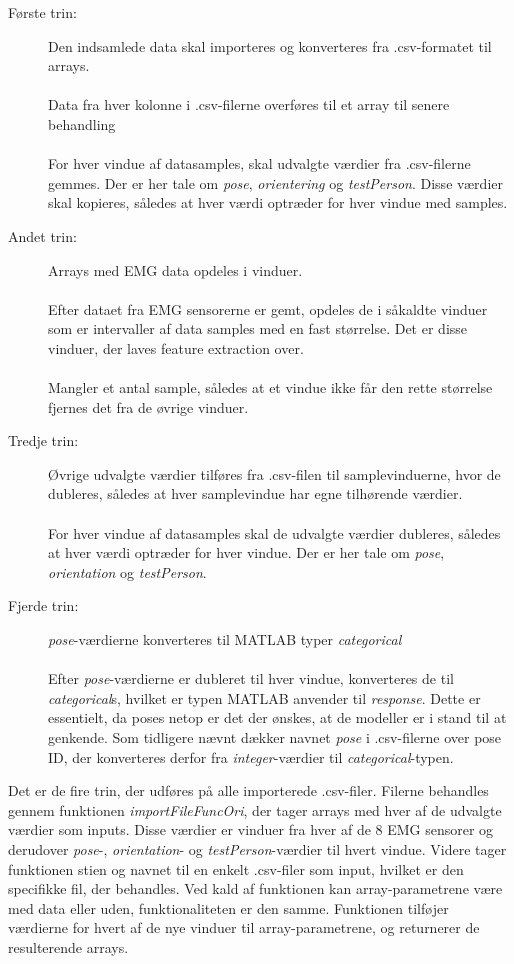 \begin{description}
	\item[Første trin:] Den indsamlede data skal importeres og konverteres fra .csv-formatet til arrays.\\\\
		Data fra hver kolonne i .csv-filerne overføres til et array til senere behandling
	\\\\
	For hver vindue af datasamples, skal udvalgte værdier fra .csv-filerne gemmes. Der er her tale om \textit{pose}, \textit{orientering} og \textit{testPerson}. Disse værdier skal kopieres, således at hver værdi optræder for hver vindue med samples.

  \item[Andet trin:] Arrays med EMG data opdeles i vinduer. 
  \\\\
  Efter dataet fra EMG sensorerne er gemt, opdeles de i såkaldte vinduer som er intervaller af data samples med en fast størrelse. Det er disse vinduer, der laves feature extraction over.
  \\\\
  Mangler et antal sample, således at et vindue ikke får den rette størrelse fjernes det fra de øvrige vinduer. 
    \item[Tredje trin:] Øvrige udvalgte værdier tilføres fra .csv-filen til samplevinduerne, hvor de dubleres, således at hver samplevindue har egne tilhørende værdier.
  \\\\
  For hver vindue af datasamples skal de udvalgte værdier dubleres, således at hver værdi optræder for hver vindue. Der er her tale om \textit{pose}, \textit{orientation} og \textit{testPerson}.
  
  \item[Fjerde trin:] \textit{pose}-værdierne konverteres til MATLAB typer \textit{categorical}
  \\\\
  Efter \textit{pose}-værdierne er dubleret til hver vindue, konverteres de til \textit{categorical}s, hvilket er typen MATLAB anvender til \textit{response}. Dette er essentielt, da poses netop er det der ønskes, at de modeller er i stand til at genkende. Som tidligere nævnt dækker navnet \textit{pose} i .csv-filerne over pose ID, der konverteres derfor fra \textit{integer}-værdier til \textit{categorical}-typen. 
\end{description}
Det er de fire trin, der udføres på alle importerede .csv-filer. Filerne behandles gennem funktionen \textit{importFileFuncOri}, der tager arrays med hver af de udvalgte værdier som inputs. Disse værdier er vinduer fra hver af de 8 EMG sensorer og derudover \textit{pose}-, \textit{orientation}- og \textit{testPerson}-værdier til hvert vindue. Videre tager funktionen stien og navnet til en enkelt .csv-filer som input, hvilket er den specifikke fil, der behandles. Ved kald af funktionen kan array-parametrene være med data eller uden, funktionaliteten er den samme. Funktionen tilføjer værdierne for hvert af de nye vinduer til array-parametrene, og returnerer de resulterende arrays. 

